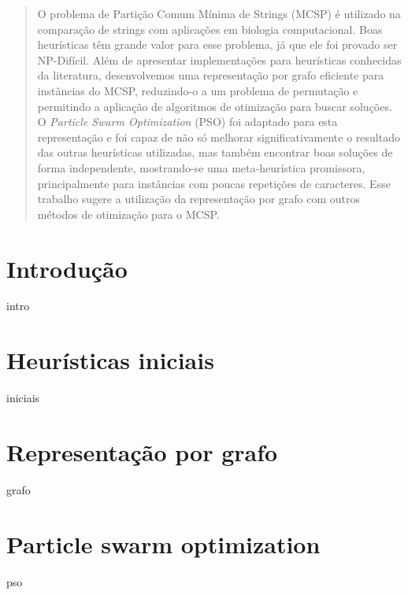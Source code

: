 \documentclass[11pt,twoside]{article}
\begin{document}

    \begin{abstract}
        O problema de Partição Comum Mínima de Strings (MCSP) é utilizado na comparação de strings com aplicações em biologia computacional. Boas heurísticas têm grande valor para esse problema, já que ele foi provado ser NP-Difícil. Além de apresentar implementações para heurísticas conhecidas da literatura, desenvolvemos uma representação por grafo eficiente para instâncias do MCSP, reduzindo-o a um problema de permutação e permitindo a aplicação de algoritmos de otimização para buscar soluções. O \textit{Particle Swarm Optimization} (PSO) foi adaptado para esta representação e foi capaz de não só melhorar significativamente o resultado das outras heurísticas utilizadas, mas também encontrar boas soluções de forma independente, mostrando-se uma meta-heurística promissora, principalmente para instâncias com poucas repetições de caracteres. Esse trabalho sugere a utilização da representação por grafo com outros métodos de otimização para o MCSP.
    \end{abstract}

    \raggedbottom


    \section{Introdução}
        {intro}

    \section{Heurísticas iniciais}
        {iniciais}

    \section{Representação por grafo}
        {grafo}

    \section{Particle swarm optimization}
        {pso}
\end{document}
